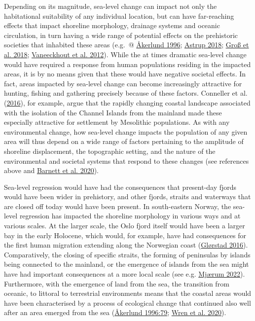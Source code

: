 \documentclass[
  12pt,
  a4paper,
  oneside]{book}
\begin{document}
Depending on its magnitude, sea-level change can impact not only the habitational suitability of any individual location, but can have far-reaching effects that impact shoreline morphology, drainage systems and oceanic circulation, in turn having a wide range of potential effects on the prehistoric societies that inhabited these areas (e.g.~@ \protect\hyperlink{ref-akerlund1996}{Åkerlund 1996}; \protect\hyperlink{ref-astrup2018}{Astrup 2018}; \protect\hyperlink{ref-gross2018}{Groß et al. 2018}; \protect\hyperlink{ref-vaneeckhout2012}{Vaneeckhout et al. 2012}). While the at times dramatic sea-level change would have required a response from human populations residing in the impacted areas, it is by no means given that these would have negative societal effects. In fact, areas impacted by sea-level change can become increasingly attractive for hunting, fishing and gathering precisely because of these factors. Conneller et al. (\protect\hyperlink{ref-conneller2016}{2016}), for example, argue that the rapidly changing coastal landscape associated with the isolation of the Channel Islands from the mainland made these especially attractive for settlement by Mesolithic populations. As with any environmental change, how sea-level change impacts the population of any given area will thus depend on a wide range of factors pertaining to the amplitude of shoreline displacement, the topographic setting, and the nature of the environmental and societal systems that respond to these changes (see references above and \protect\hyperlink{ref-barnett2020}{Barnett et al. 2020}).

Sea-level regression would have had the consequences that present-day fjords would have been wider in prehistory, and other fjords, straits and waterways that are closed off today would have been present. In south-eastern Norway, the sea-level regression has impacted the shoreline morphology in various ways and at various scales. At the larger scale, the Oslo fjord itself would have been a larger bay in the early Holocene, which would, for example, have had consequences for the first human migration extending along the Norwegian coast (\protect\hyperlink{ref-glorstad2016}{Glørstad 2016}). Comparatively, the closing of specific straits, the forming of peninsulas by islands being connected to the mainland, or the emergence of islands from the sea might have had important consequences at a more local scale (see e.g. \protect\hyperlink{ref-mjuxe6rum2022}{Mjærum 2022}). Furthermore, with the emergence of land from the sea, the transition from oceanic, to littoral to terrestrial environments means that the coastal areas would have been characterised by a process of ecological change that continued also well after an area emerged from the sea (\protect\hyperlink{ref-akerlund1996}{Åkerlund 1996:79}; \protect\hyperlink{ref-wren2020}{Wren et al. 2020}).
\end{document}
